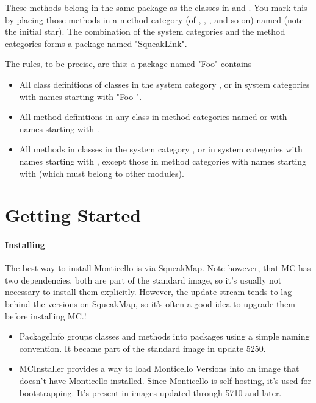 \documentclass[a4paper,10pt,twoside]{book}
\begin{document}
These methods belong in the same package as the classes in  and . You mark this by placing those methods in a method category (of , , , and so on) named  (note the initial star). The combination of the  system categories and the  method categories forms a package named "SqueakLink".

The rules, to be precise, are this: a package named "Foo" contains

\begin{itemize}
\item All class definitions of classes in the system category , or in system categories with names starting with "Foo-".
\item All method definitions in any class in method categories named  or with names starting with .
\item All methods in classes in the system category , or in system categories with names starting with , except those in method categories with names starting with \cat{*} (which must belong to other modules).
\end{itemize}

\section{Getting Started}

\paragraph{Installing}

The best way to install Monticello is via SqueakMap. Note however, that MC has two dependencies, both are part of the standard image, so it's usually not necessary to install them explicitly. However, the update stream tends to lag behind the versions on SqueakMap, so it's often a good idea to upgrade them before installing MC.!
\begin{itemize}
\item PackageInfo groups classes and methods into packages using a simple naming convention. It became part of the standard image in update 5250.
\item MCInstaller provides a way to load Monticello Versions into an image that doesn't have Monticello installed. Since Monticello is self hosting, it's used for bootstrapping. It's present in images updated through 5710 and later.
\end{itemize}
\end{document}
